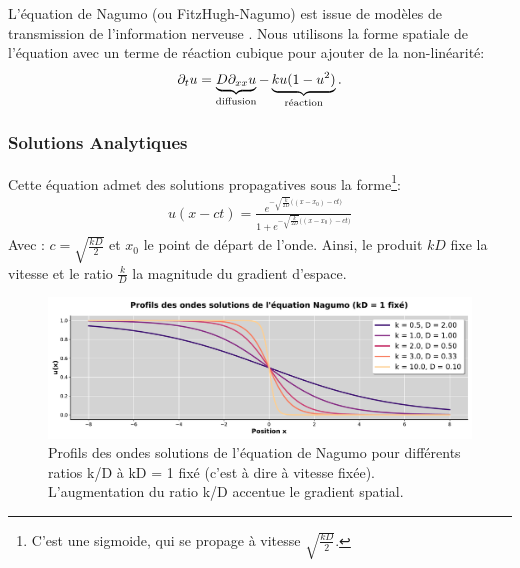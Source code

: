 L'équation de Nagumo (ou FitzHugh-Nagumo) est issue de modèles de transmission de l'information nerveuse \cite{FITZHUGH1961445}.
Nous utilisons la forme spatiale de l'équation \cite{keener1998mathematical} avec un terme de réaction cubique pour ajouter de la non-linéarité:
\begin{align}
    \partial_t u = \underbrace{D \partial_{xx} u}_{\text{diffusion}}
            - \underbrace{ku(1-u^2)}_{\text{réaction}}.
\end{align}
\subsubsection{Solutions Analytiques}
Cette équation admet des solutions propagatives sous la forme\footnote{C'est une sigmoide, qui se propage à vitesse $\sqrt{\frac{kD}{2}}$.}:%
\begin{align}
    \label{eq:sol_nagumo}
 u(x-ct) = \frac{e^{
 -\sqrt{\frac{k}{2D}} \bigl((x-x_0) - ct \bigr)}
 }
 {1 + e^{
 -\sqrt{\frac{k}{2D}} \bigl((x-x_0) - ct \bigr)}
 }
\end{align}
Avec : $c = \sqrt{\frac{kD}{2}}$ et $x_0$ le point de départ de l'onde.
Ainsi, le produit $kD$ fixe la vitesse et le ratio $\frac{k}{D}$ la magnitude du gradient d'espace.

\begin{figure}[htbp]
    \centering
    \includegraphics[width=\textwidth]{media/4_travail/2_nagumo/profils_nagumo.pdf}
    \caption{Profils des ondes solutions de l'équation de Nagumo pour différents ratios k/D à kD = 1 fixé (c'est à dire à vitesse fixée). L'augmentation du ratio k/D accentue le gradient spatial.}
    \label{fig:profils_nagumo}
\end{figure}

